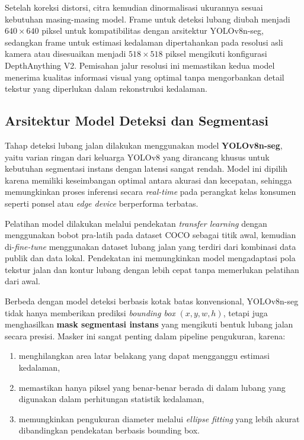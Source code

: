 Setelah koreksi distorsi, citra kemudian dinormalisasi ukurannya sesuai kebutuhan masing-masing model. Frame untuk deteksi lubang diubah menjadi $640 \times 640$ piksel untuk kompatibilitas dengan arsitektur YOLOv8n-seg, sedangkan frame untuk estimasi kedalaman dipertahankan pada resolusi asli kamera atau disesuaikan menjadi $518 \times 518$ piksel mengikuti konfigurasi DepthAnything V2. Pemisahan jalur resolusi ini memastikan kedua model menerima kualitas informasi visual yang optimal tanpa mengorbankan detail tekstur yang diperlukan dalam rekonstruksi kedalaman.

\subsection{Arsitektur Model Deteksi dan Segmentasi}
Tahap deteksi lubang jalan dilakukan menggunakan model \textbf{YOLOv8n-seg}, yaitu varian ringan dari keluarga YOLOv8 yang dirancang khusus untuk kebutuhan segmentasi instans dengan latensi sangat rendah. Model ini dipilih karena memiliki keseimbangan optimal antara akurasi dan kecepatan, sehingga memungkinkan proses inferensi secara \textit{real-time} pada perangkat kelas konsumen seperti ponsel atau \textit{edge device} berperforma terbatas.

Pelatihan model dilakukan melalui pendekatan \textit{transfer learning} dengan menggunakan bobot pra-latih pada dataset COCO sebagai titik awal, kemudian di-\textit{fine-tune} menggunakan dataset lubang jalan yang terdiri dari kombinasi data publik dan data lokal. Pendekatan ini memungkinkan model mengadaptasi pola tekstur jalan dan kontur lubang dengan lebih cepat tanpa memerlukan pelatihan dari awal.

Berbeda dengan model deteksi berbasis kotak batas konvensional, YOLOv8n-seg tidak hanya memberikan prediksi \textit{bounding box} $(x, y, w, h)$, tetapi juga menghasilkan \textbf{mask segmentasi instans} yang mengikuti bentuk lubang jalan secara presisi. Masker ini sangat penting dalam pipeline pengukuran, karena:

\begin{enumerate}
    \item menghilangkan area latar belakang yang dapat mengganggu estimasi kedalaman,
    \item memastikan hanya piksel yang benar-benar berada di dalam lubang yang digunakan dalam perhitungan statistik kedalaman,
    \item memungkinkan pengukuran diameter melalui \textit{ellipse fitting} yang lebih akurat dibandingkan pendekatan berbasis bounding box.
\end{enumerate}

